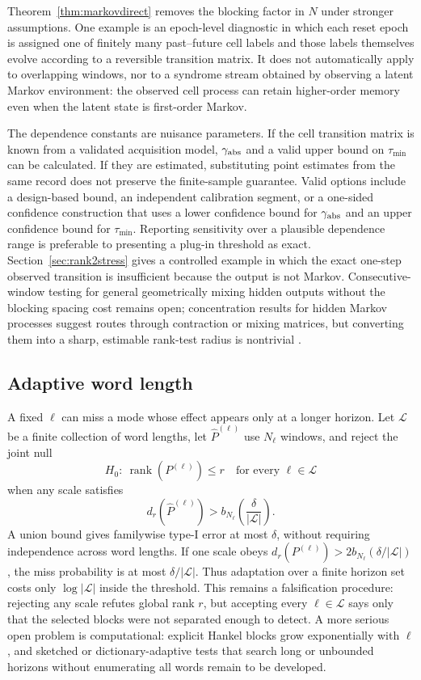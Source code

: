 \documentclass[11pt]{article}
\newcommand{\rank}{\operatorname{rank}}
\begin{document}
Theorem~\ref{thm:markovdirect} removes the blocking factor in $N$ under stronger assumptions. One example is an epoch-level diagnostic in which each reset epoch is assigned one of finitely many past--future cell labels and those labels themselves evolve according to a reversible transition matrix. It does not automatically apply to overlapping windows, nor to a syndrome stream obtained by observing a latent Markov environment: the observed cell process can retain higher-order memory even when the latent state is first-order Markov.

The dependence constants are nuisance parameters. If the cell transition matrix is known from a validated acquisition model, $\gamma_{\rm abs}$ and a valid upper bound on $\tau_{\min}$ can be calculated. If they are estimated, substituting point estimates from the same record does not preserve the finite-sample guarantee. Valid options include a design-based bound, an independent calibration segment, or a one-sided confidence construction that uses a lower confidence bound for $\gamma_{\rm abs}$ and an upper confidence bound for $\tau_{\min}$. Reporting sensitivity over a plausible dependence range is preferable to presenting a plug-in threshold as exact. Section~\ref{sec:rank2stress} gives a controlled example in which the exact one-step observed transition is insufficient because the output is not Markov. Consecutive-window testing for general geometrically mixing hidden outputs without the blocking spacing cost remains open; concentration results for hidden Markov processes suggest routes through contraction or mixing matrices, but converting them into a sharp, estimable rank-test radius is nontrivial \cite{kontorovich2008dependent}.

\subsection{Adaptive word length}
A fixed $\ell$ can miss a mode whose effect appears only at a longer horizon. Let $\mathcal L$ be a finite collection of word lengths, let $\widehat P^{(\ell)}$ use $N_\ell$ windows, and reject the joint null
\[
 H_0:\ \rank(P^{(\ell)})\le r\quad\text{for every }\ell\in\mathcal L
\]
when any scale satisfies
\begin{equation}
 d_r(\widehat P^{(\ell)})>
 b_{N_\ell}\!\left(\frac{\delta}{|\mathcal L|}\right).
 \label{eq:multiscale}
\end{equation}
A union bound gives familywise type-I error at most $\delta$, without requiring independence across word lengths. If one scale obeys
$d_r(P^{(\ell)})>2b_{N_\ell}(\delta/|\mathcal L|)$, the miss probability is at most $\delta/|\mathcal L|$. Thus adaptation over a finite horizon set costs only $\log|\mathcal L|$ inside the threshold. This remains a falsification procedure: rejecting any scale refutes global rank $r$, but accepting every $\ell\in\mathcal L$ says only that the selected blocks were not separated enough to detect. A more serious open problem is computational: explicit Hankel blocks grow exponentially with $\ell$, and sketched or dictionary-adaptive tests that search long or unbounded horizons without enumerating all words remain to be developed.
\end{document}
